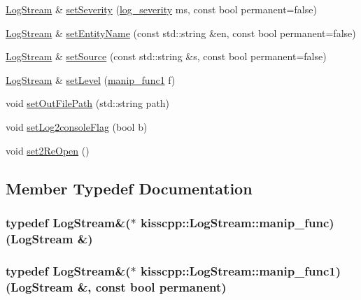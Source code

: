 \begin{DoxyCompactItemize}
\item 
\hyperlink{classkisscpp_1_1_log_stream}{Log\-Stream} \& \hyperlink{classkisscpp_1_1_log_stream_acc6d5cdabae2f2febd89518dee4ef14a}{set\-Severity} (\hyperlink{namespacekisscpp_a2479a56cdedf21357ca5c68adc699d00}{log\-\_\-severity} ms, const bool permanent=false)
\item 
\hyperlink{classkisscpp_1_1_log_stream}{Log\-Stream} \& \hyperlink{classkisscpp_1_1_log_stream_a2eb0e6909fbdce8648f349dde4b3330c}{set\-Entity\-Name} (const std\-::string \&en, const bool permanent=false)
\item 
\hyperlink{classkisscpp_1_1_log_stream}{Log\-Stream} \& \hyperlink{classkisscpp_1_1_log_stream_a2c96be0773180e5f0f9ba9b54a0374ae}{set\-Source} (const std\-::string \&s, const bool permanent=false)
\item 
\hyperlink{classkisscpp_1_1_log_stream}{Log\-Stream} \& \hyperlink{classkisscpp_1_1_log_stream_afbccf2eeb34441a14113b29b89c15f88}{set\-Level} (\hyperlink{classkisscpp_1_1_log_stream_ab6994c757d4c63c4388a932cf2be2c9d}{manip\-\_\-func1} f)
\item 
void \hyperlink{classkisscpp_1_1_log_stream_afb35292a073160d5fc74b1e94512226e}{set\-Out\-File\-Path} (std\-::string path)
\item 
void \hyperlink{classkisscpp_1_1_log_stream_ab9813d6efb18c2533dd0489306af5f3d}{set\-Log2console\-Flag} (bool b)
\item 
void \hyperlink{classkisscpp_1_1_log_stream_a739a620e8f2e957e79cfbdd3e7f58500}{set2\-Re\-Open} ()
\end{DoxyCompactItemize}


\subsection{Member Typedef Documentation}
\hypertarget{classkisscpp_1_1_log_stream_abb058ef2b1b57fb7e0b89c3312794ada}{
\subsubsection[{manip\-\_\-func}]{\setlength{\rightskip}{0pt plus 5cm}typedef {\bf Log\-Stream}\&($\ast$ kisscpp\-::\-Log\-Stream\-::manip\-\_\-func)({\bf Log\-Stream} \&)}}\label{classkisscpp_1_1_log_stream_abb058ef2b1b57fb7e0b89c3312794ada}
\hypertarget{classkisscpp_1_1_log_stream_ab6994c757d4c63c4388a932cf2be2c9d}{
\subsubsection[{manip\-\_\-func1}]{\setlength{\rightskip}{0pt plus 5cm}typedef {\bf Log\-Stream}\&($\ast$ kisscpp\-::\-Log\-Stream\-::manip\-\_\-func1)({\bf Log\-Stream} \&, const bool permanent)}}\label{classkisscpp_1_1_log_stream_ab6994c757d4c63c4388a932cf2be2c9d}


